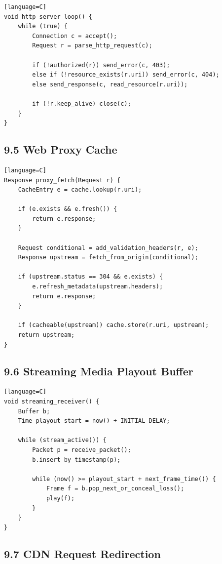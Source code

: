 \documentclass[11pt]{article}
\begin{document}
\begin{verbatim}[language=C]
void http_server_loop() {
    while (true) {
        Connection c = accept();
        Request r = parse_http_request(c);

        if (!authorized(r)) send_error(c, 403);
        else if (!resource_exists(r.uri)) send_error(c, 404);
        else send_response(c, read_resource(r.uri));

        if (!r.keep_alive) close(c);
    }
}
\end{verbatim}

\subsection{9.5 Web Proxy Cache}\label{web-proxy-cache}

\begin{verbatim}[language=C]
Response proxy_fetch(Request r) {
    CacheEntry e = cache.lookup(r.uri);

    if (e.exists && e.fresh()) {
        return e.response;
    }

    Request conditional = add_validation_headers(r, e);
    Response upstream = fetch_from_origin(conditional);

    if (upstream.status == 304 && e.exists) {
        e.refresh_metadata(upstream.headers);
        return e.response;
    }

    if (cacheable(upstream)) cache.store(r.uri, upstream);
    return upstream;
}
\end{verbatim}

\subsection{9.6 Streaming Media Playout
Buffer}\label{streaming-media-playout-buffer}

\begin{verbatim}[language=C]
void streaming_receiver() {
    Buffer b;
    Time playout_start = now() + INITIAL_DELAY;

    while (stream_active()) {
        Packet p = receive_packet();
        b.insert_by_timestamp(p);

        while (now() >= playout_start + next_frame_time()) {
            Frame f = b.pop_next_or_conceal_loss();
            play(f);
        }
    }
}
\end{verbatim}

\subsection{9.7 CDN Request Redirection}\label{cdn-request-redirection}
\end{document}
